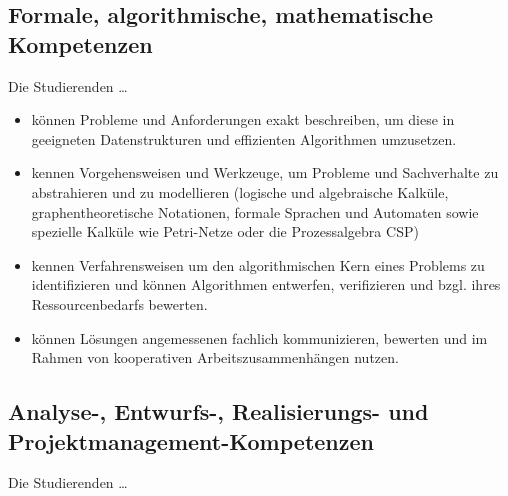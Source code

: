 \subsection{Formale, algorithmische, mathematische
Kompetenzen}\label{formale-algorithmische-mathematische-kompetenzen}

Die Studierenden \ldots{}

\begin{itemize}
\tightlist
\item
  können Probleme und Anforderungen exakt beschreiben, um diese in
  geeigneten Datenstrukturen und effizienten Algorithmen umzusetzen.
\item
  kennen Vorgehensweisen und Werkzeuge, um Probleme und Sachverhalte zu
  abstrahieren und zu modellieren (logische und algebraische Kalküle,
  graphentheoretische Notationen, formale Sprachen und Automaten sowie
  spezielle Kalküle wie Petri-Netze oder die Prozessalgebra CSP)
\item
  kennen Verfahrensweisen um den algorithmischen Kern eines Problems zu
  identifizieren und können Algorithmen entwerfen, verifizieren und
  bzgl. ihres Ressourcenbedarfs bewerten.
\item
  können Lösungen angemessenen fachlich kommunizieren, bewerten und im
  Rahmen von kooperativen Arbeitszusammenhängen nutzen.
\end{itemize}

\subsection{Analyse-, Entwurfs-, Realisierungs- und
Projektmanagement-Kompetenzen}\label{analyse--entwurfs--realisierungs--und-projektmanagement-kompetenzen}

Die Studierenden \ldots{}

